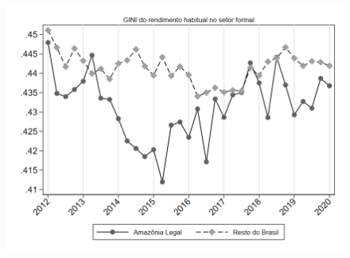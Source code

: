 \begin{frame}[label=_estrutura_renda_gini_formal]{}
\textit{\hyperlink{_estrutura_renda}{}}
\begin{figure}
  \centering
  \includegraphics[width=1.0\linewidth]{../../analysis/output/estrutura_renda/_estrutura_renda_gini_formal.png}
  \caption{}
  \label{fig:_estrutura_renda_gini_formal}
\end{figure}
\end{frame}
